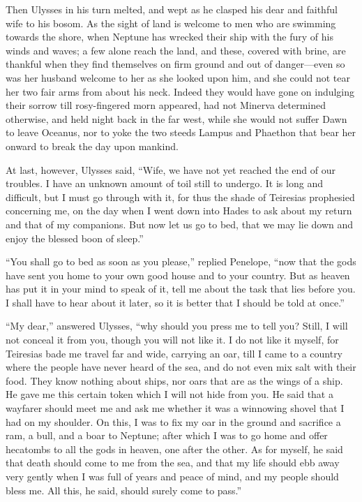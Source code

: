 Then Ulysses in his turn melted, and wept as he clasped his dear and faithful
wife to his bosom. As the sight of land is welcome to men who are swimming
towards the shore, when Neptune has wrecked their ship with the fury of his
winds and waves; a few alone reach the land, and these, covered with brine, are
thankful when they find themselves on firm ground and out of danger—even so was
her husband welcome to her as she looked upon him, and she could not tear her
two fair arms from about his neck. Indeed they would have gone on indulging
their sorrow till rosy-fingered morn appeared, had not Minerva determined
otherwise, and held night back in the far west, while she would not suffer Dawn
to leave Oceanus, nor to yoke the two steeds Lampus and Phaethon that bear her
onward to break the day upon mankind.

At last, however, Ulysses said, “Wife, we have not yet reached the end of our
troubles. I have an unknown amount of toil still to undergo. It is long and
difficult, but I must go through with it, for thus the shade of Teiresias
prophesied concerning me, on the day when I went down into Hades to ask about
my return and that of my companions. But now let us go to bed, that we may lie
down and enjoy the blessed boon of sleep.”

“You shall go to bed as soon as you please,” replied Penelope, “now that the
gods have sent you home to your own good house and to your country. But as
heaven has put it in your mind to speak of it, tell me about the task that lies
before you. I shall have to hear about it later, so it is better that I should
be told at once.”

“My dear,” answered Ulysses, “why should you press me to tell you? Still, I
will not conceal it from you, though you will not like it. I do not like it
myself, for Teiresias bade me travel far and wide, carrying an oar, till I came
to a country where the people have never heard of the sea, and do not even mix
salt with their food. They know nothing about ships, nor oars that are as the
wings of a ship. He gave me this certain token which I will not hide from you.
He said that a wayfarer should meet me and ask me whether it was a winnowing
shovel that I had on my shoulder. On this, I was to fix my oar in the ground
and sacrifice a ram, a bull, and a boar to Neptune; after which I was to go
home and offer hecatombs to all the gods in heaven, one after the other. As for
myself, he said that death should come to me from the sea, and that my life
should ebb away very gently when I was full of years and peace of mind, and my
people should bless me. All this, he said, should surely come to pass.”

